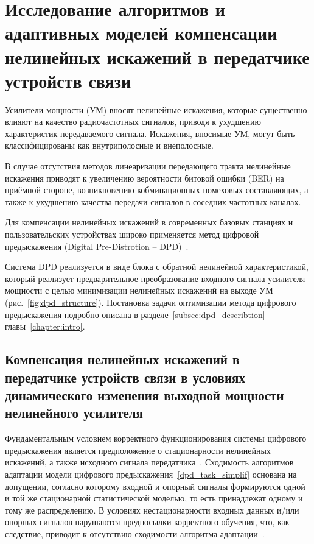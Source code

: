 \section{Исследование алгоритмов и адаптивных моделей компенсации нелинейных искажений в передатчике устройств связи} \label{sec:dpd_exp}


Усилители мощности (УМ) вносят нелинейные искажения, которые существенно влияют на качество радиочастотных сигналов, приводя к ухудшению характеристик передаваемого сигнала. Искажения, вносимые УМ, могут быть классифицированы как внутриполосные и внеполосные.

В случае отсутствия методов линеаризации передающего тракта нелинейные искажения приводят к увеличению вероятности битовой ошибки (BER) на приёмной стороне, возникновению кобминационных помеховых составляющих, а также к ухудшению качества передачи сигналов в соседних частотных каналах. 

Для компенсации нелинейных искажений в современных базовых станциях и пользовательских устройствах широко применяется метод цифровой предыскажения (Digital Pre-Distrotion -- DPD)~\cite{dpd_models, GuoYan_PA_DPD_2015, GuoYan_PA_DPD_Poly}.

Система DPD реализуется в виде блока с обратной нелинейной характеристикой, который реализует предварительное преобразование входного сигнала усилителя мощности с целью минимизации нелинейных искажений на выходе УМ (рис.~\ref{fig:dpd_structure}). Постановка задачи оптимизации метода цифрового предыскажения подробно описана в разделе~\ref{subsec:dpd_describtion} главы~\ref{chapter:intro}.

\subsection{Компенсация нелинейных искажений в передатчике устройств связи в условиях динамического изменения выходной мощности нелинейного усилителя} \label{subsec:dynamic_dpd_2d}

Фундаментальным условием корректного функционирования системы цифрового предыскажения является предположение о стационарности нелинейных искажений, а также исходного сигнала передатчика~\cite{dpd_models}. Сходимость алгоритмов адаптации модели цифрового предыскажения~\eqref{dpd_task_simplif} основана на допущении, согласно которому входной и опорный сигналы формируются одной и той же стационарной статистической моделью, то есть принадлежат одному и тому же распределению. В условиях нестационарности входных данных и/или опорных сигналов нарушаются предпосылки корректного обучения, что, как следствие, приводит к отсутствию сходимости алгоритма адаптации~\cite{widrow1985adaptive}.


